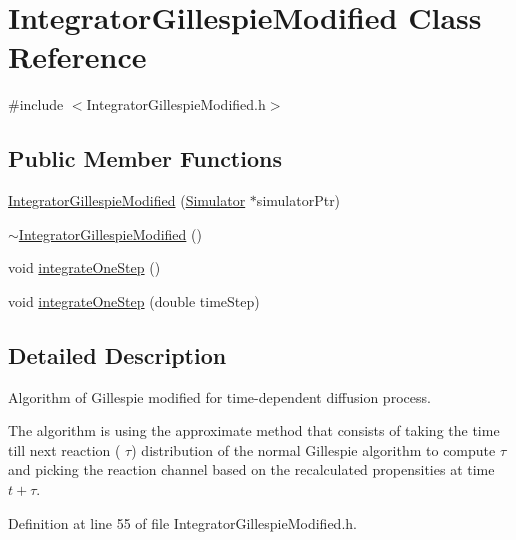 \hypertarget{class_integrator_gillespie_modified}{\section{\-Integrator\-Gillespie\-Modified \-Class \-Reference}
\label{class_integrator_gillespie_modified}
}


{\ttfamily \#include $<$\-Integrator\-Gillespie\-Modified.\-h$>$}

\subsection*{\-Public \-Member \-Functions}
\begin{DoxyCompactItemize}
\item 
\hyperlink{class_integrator_gillespie_modified_a8ec41219d1684aef6d71bc0972de10b8}{\-Integrator\-Gillespie\-Modified} (\hyperlink{class_simulator}{\-Simulator} $\ast$simulator\-Ptr)
\item 
\hyperlink{class_integrator_gillespie_modified_ab73be5c9be0f4f94711187022a67dcc1}{$\sim$\-Integrator\-Gillespie\-Modified} ()
\item 
void \hyperlink{class_integrator_gillespie_modified_a055f49148993f45f1b646690c88d705b}{integrate\-One\-Step} ()
\item 
void \hyperlink{class_integrator_gillespie_modified_ad21da74d0858adfe4eed851bd0b84c21}{integrate\-One\-Step} (double time\-Step)
\end{DoxyCompactItemize}


\subsection{\-Detailed \-Description}
\-Algorithm of \-Gillespie modified for time-\/dependent diffusion process.

\-The algorithm is using the approximate method that consists of taking the time till next reaction ( $ \tau $) distribution of the normal \-Gillespie algorithm to compute $ \tau $ and picking the reaction channel based on the recalculated propensities at time $ t+ \tau $. 

\-Definition at line 55 of file \-Integrator\-Gillespie\-Modified.\-h.




